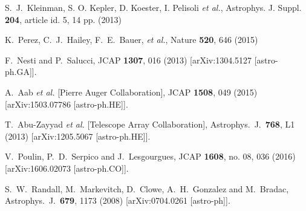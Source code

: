 \documentclass[twocolumn,preprintnumbers,amsmath,amssymb,prl, superscriptaddress]{revtex4}
\begin{document}
\begin{thebibliography}{99}
S.~J.~Kleinman, S. O. Kepler, D. Koester, I. Pelisoli  {\it et al.}, Astrophys. J. Suppl. {\bf 204}, article
id. 5, 14 pp. (2013)

K.~Perez, C.~J.~Hailey, F.~E.~Bauer, {\it et al.}, Nature {\bf 520}, 646 (2015)

  F.~Nesti and P.~Salucci,
  JCAP {\bf 1307}, 016 (2013)
  [arXiv:1304.5127 [astro-ph.GA]].


  A.~Aab {\it et al.} [Pierre Auger Collaboration],
  JCAP {\bf 1508}, 049 (2015)
  [arXiv:1503.07786 [astro-ph.HE]].


  T.~Abu-Zayyad {\it et al.} [Telescope Array Collaboration],
  Astrophys.\ J.\  {\bf 768}, L1 (2013)
  [arXiv:1205.5067 [astro-ph.HE]].


  V.~Poulin, P.~D.~Serpico and J.~Lesgourgues,
  JCAP {\bf 1608}, no. 08, 036 (2016)
  [arXiv:1606.02073 [astro-ph.CO]].


  S.~W.~Randall, M.~Markevitch, D.~Clowe, A.~H.~Gonzalez and M.~Bradac,
  Astrophys.\ J.\  {\bf 679}, 1173 (2008)
  [arXiv:0704.0261 [astro-ph]].



\end{thebibliography}
\end{document}
